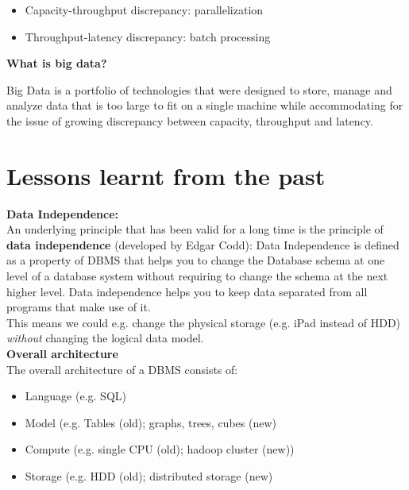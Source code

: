 \documentclass[11pt,oneside,a4paper]{article}
\begin{document}
\vspace{-\topsep}
\begin{itemize}
	\setlength{\itemsep}{0pt}
	\setlength{\parskip}{0pt}
	\item Capacity-throughput discrepancy: parallelization
	\item Throughput-latency discrepancy: batch processing
\end{itemize}
\vspace{-\topsep}

\textbf{What is big data?}

Big Data is a portfolio of technologies that were designed to store, manage and analyze data that is too large to fit on a single machine while accommodating for the issue of growing discrepancy between
capacity, throughput and latency.

\section{Lessons learnt from the past}

\textbf{Data Independence:}\\
An underlying principle that has been valid for a long time is the principle of \textbf{data independence} (developed by Edgar Codd): Data Independence is defined as a property of DBMS that helps you to change the Database schema at one level of a database system without requiring to change the schema at the next higher level. Data independence helps you to keep data separated from all programs that make use of it.\\
This means we could e.g. change the physical storage (e.g. iPad instead of HDD) \textit{without} changing the logical data model.\\

\textbf{Overall architecture}\\
The overall architecture of a DBMS consists of:

\vspace{-\topsep}
\begin{itemize}
	\setlength{\itemsep}{0pt}
	\setlength{\parskip}{0pt}
	\item Language (e.g. SQL)
	\item Model (e.g. Tables (old); graphs, trees, cubes (new)
	\item Compute (e.g. single CPU (old); hadoop cluster (new))
	\item Storage (e.g. HDD (old); distributed storage (new)
\end{itemize}
\vspace{-\topsep}
\end{document}
